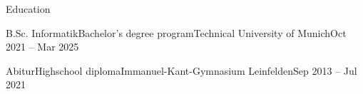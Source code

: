 \documentclass{kyvernitis-resume}
\begin{document}
\resumeheader
{}
{}
{}
{}{}{}


\begin{section}{Education}
    \begin{subsectionnobullet}{B.Sc. Informatik}{Bachelor's degree program}{Technical University of Munich}{Oct 2021 -- Mar 2025}
    \end{subsectionnobullet}
    
    \begin{subsectionnobullet}{Abitur}{Highschool diploma}{Immanuel-Kant-Gymnasium Leinfelden}{Sep 2013 -- Jul 2021}
    \end{subsectionnobullet}
\end{section}
\end{document}
